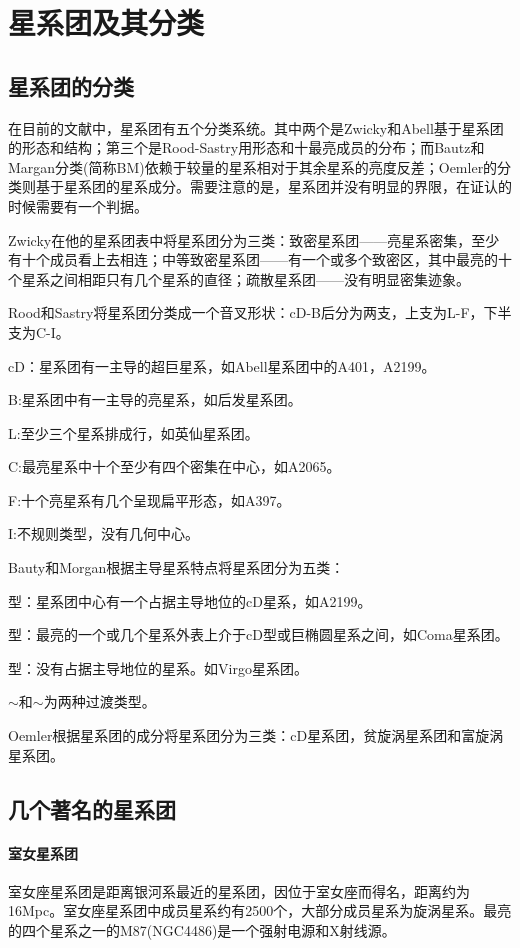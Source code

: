 \section{星系团及其分类}
\subsection{星系团的分类}在目前的文献中，星系团有五个分类系统。其中两个是Zwicky和Abell基于星系团的形态和结构；第三个是Rood-Sastry用形态和十最亮成员的分布；而Bautz和Margan分类(简称BM)依赖于较量的星系相对于其余星系的亮度反差；Oemler的分类则基于星系团的星系成分。需要注意的是，星系团并没有明显的界限，在证认的时候需要有一个判据。

Zwicky在他的星系团表中将星系团分为三类：致密星系团——亮星系密集，至少有十个成员看上去相连；中等致密星系团——有一个或多个致密区，其中最亮的十个星系之间相距只有几个星系的直径；疏散星系团——没有明显密集迹象。

Rood和Sastry将星系团分类成一个音叉形状：cD-B后分为两支，上支为L-F，下半支为C-I。

cD：星系团有一主导的超巨星系，如Abell星系团中的A401，A2199。

B:星系团中有一主导的亮星系，如后发星系团。

L:至少三个星系排成行，如英仙星系团。

C:最亮星系中十个至少有四个密集在中心，如A2065。

F:十个亮星系有几个呈现扁平形态，如A397。

I:不规则类型，没有几何中心。

Bauty和Morgan根据主导星系特点将星系团分为五类：

型：星系团中心有一个占据主导地位的cD星系，如A2199。

型：最亮的一个或几个星系外表上介于cD型或巨椭圆星系之间，如Coma星系团。

型：没有占据主导地位的星系。如Virgo星系团。

$\sim$和$\sim$为两种过渡类型。

Oemler根据星系团的成分将星系团分为三类：cD星系团，贫旋涡星系团和富旋涡星系团。
\subsection{几个著名的星系团}
\paragraph{室女星系团}室女座星系团是距离银河系最近的星系团，因位于室女座而得名，距离约为16Mpc。室女座星系团中成员星系约有2500个，大部分成员星系为旋涡星系。最亮的四个星系之一的M87(NGC4486)是一个强射电源和X射线源。
